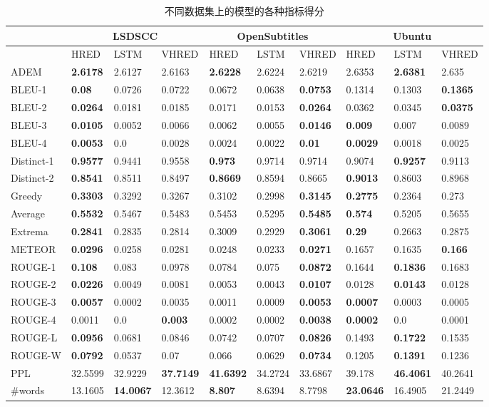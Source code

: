 \begin{table}%
\centering%
\caption{不同数据集上的模型的各种指标得分}%
\label{tab:systemScoresAll}%
\setlength{\tabcolsep}{0.11cm}%
\begin{tabular}{@{}llllllllll@{}}%
\toprule%
\midrule%
&\multicolumn{3}{c}{LSDSCC}&\multicolumn{3}{c}{OpenSubtitles}&\multicolumn{3}{c}{Ubuntu}\\%
\midrule%
&HRED&LSTM&VHRED&HRED&LSTM&VHRED&HRED&LSTM&VHRED\\%
\midrule%
ADEM&\textbf{2.6178}&2.6127&2.6163&\textbf{2.6228}&2.6224&2.6219&2.6353&\textbf{2.6381}&2.635\\%
BLEU{-}1&\textbf{0.08}&0.0726&0.0722&0.0672&0.0638&\textbf{0.0753}&0.1314&0.1303&\textbf{0.1365}\\%
BLEU{-}2&\textbf{0.0264}&0.0181&0.0185&0.0171&0.0153&\textbf{0.0264}&0.0362&0.0345&\textbf{0.0375}\\%
BLEU{-}3&\textbf{0.0105}&0.0052&0.0066&0.0062&0.0055&\textbf{0.0146}&\textbf{0.009}&0.007&0.0089\\%
BLEU{-}4&\textbf{0.0053}&0.0&0.0028&0.0024&0.0022&\textbf{0.01}&\textbf{0.0029}&0.0018&0.0025\\%
Distinct{-}1&\textbf{0.9577}&0.9441&0.9558&\textbf{0.973}&0.9714&0.9714&0.9074&\textbf{0.9257}&0.9113\\%
Distinct{-}2&\textbf{0.8541}&0.8511&0.8497&\textbf{0.8669}&0.8594&0.8665&\textbf{0.9013}&0.8603&0.8968\\%
Greedy&\textbf{0.3303}&0.3292&0.3267&0.3102&0.2998&\textbf{0.3145}&\textbf{0.2775}&0.2364&0.273\\%
Average&\textbf{0.5532}&0.5467&0.5483&0.5453&0.5295&\textbf{0.5485}&\textbf{0.574}&0.5205&0.5655\\%
Extrema&\textbf{0.2841}&0.2835&0.2814&0.3009&0.2929&\textbf{0.3061}&\textbf{0.29}&0.2663&0.2875\\%
METEOR&\textbf{0.0296}&0.0258&0.0281&0.0248&0.0233&\textbf{0.0271}&0.1657&0.1635&\textbf{0.166}\\%
ROUGE{-}1&\textbf{0.108}&0.083&0.0978&0.0784&0.075&\textbf{0.0872}&0.1644&\textbf{0.1836}&0.1683\\%
ROUGE{-}2&\textbf{0.0226}&0.0049&0.0081&0.0053&0.0043&\textbf{0.0107}&0.0128&\textbf{0.0143}&0.0128\\%
ROUGE{-}3&\textbf{0.0057}&0.0002&0.0035&0.0011&0.0009&\textbf{0.0053}&\textbf{0.0007}&0.0003&0.0005\\%
ROUGE{-}4&0.0011&0.0&\textbf{0.003}&0.0002&0.0002&\textbf{0.0038}&\textbf{0.0002}&0.0&0.0001\\%
ROUGE{-}L&\textbf{0.0956}&0.0681&0.0846&0.0742&0.0707&\textbf{0.0826}&0.1493&\textbf{0.1722}&0.1535\\%
ROUGE{-}W&\textbf{0.0792}&0.0537&0.07&0.066&0.0629&\textbf{0.0734}&0.1205&\textbf{0.1391}&0.1236\\%
PPL&32.5599&32.9229&\textbf{37.7149}&\textbf{41.6392}&34.2724&33.6867&39.178&\textbf{46.4061}&40.2641\\%
\#words&13.1605&\textbf{14.0067}&12.3612&\textbf{8.807}&8.6394&8.7798&\textbf{23.0646}&16.4905&21.2449\\\bottomrule%
%
\end{tabular}%
\end{table}